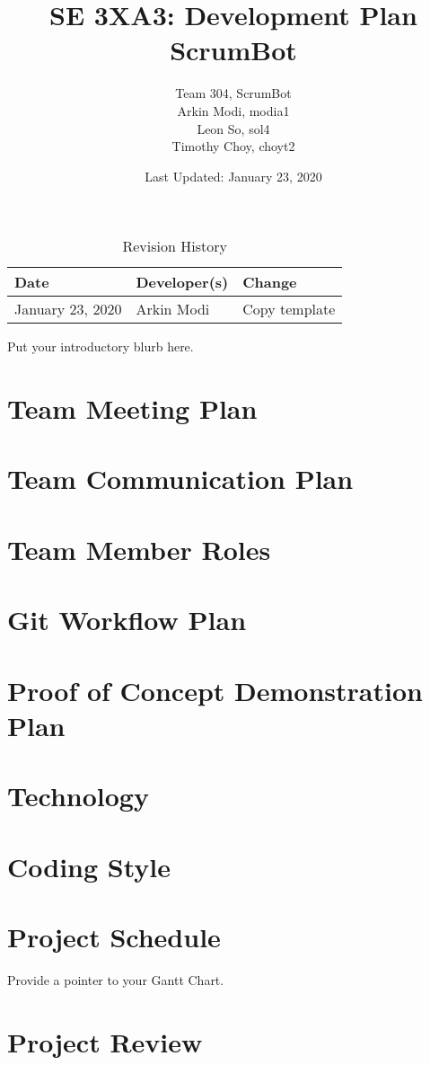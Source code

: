 \documentclass{article}
\title{SE 3XA3: Development Plan\\ScrumBot}
\author{
	Team 304, ScrumBot
		\\ Arkin Modi, modia1
        \\ Leon So, sol4
        \\ Timothy Choy, choyt2
}
\date{Last Updated: January 23, 2020}
\begin{document}
\begin{table}[hp]
    \caption{Revision History} \label{TblRevisionHistory}
    \begin{tabularx}{\textwidth}{llX}
        \toprule
            \textbf{Date} & \textbf{Developer(s)} & \textbf{Change}\\
        \midrule
            January 23, 2020 & Arkin Modi & Copy template\\
        \bottomrule
    \end{tabularx}
\end{table}

\newpage

\maketitle

Put your introductory blurb here.

\section{Team Meeting Plan}

\section{Team Communication Plan}

\section{Team Member Roles}

\section{Git Workflow Plan}

\section{Proof of Concept Demonstration Plan}

\section{Technology}

\section{Coding Style}

\section{Project Schedule}

Provide a pointer to your Gantt Chart.

\section{Project Review}
\end{document}
